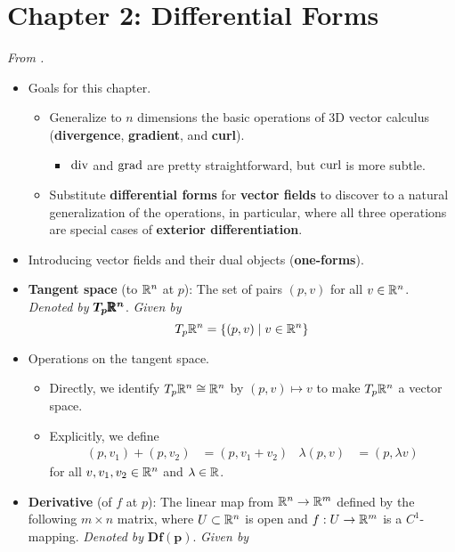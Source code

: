 \documentclass[../notes.tex]{subfiles}
\begin{document}
\section{Chapter 2: Differential Forms}
\emph{From \textcite{bib:DifferentialForms}.}
\begin{itemize}
    \item {}Goals for this chapter.
    \begin{itemize}
        \item Generalize to $n$ dimensions the basic operations of 3D vector calculus (\textbf{divergence}, \textbf{gradient}, and \textbf{curl}).
        \begin{itemize}
            \item $\operatorname{div}$ and $\operatorname{grad}$ are pretty straightforward, but $\operatorname{curl}$ is more subtle.
        \end{itemize}
        \item Substitute \textbf{differential forms} for \textbf{vector fields} to discover to a natural generalization of the operations, in particular, where all three operations are special cases of \textbf{exterior differentiation}.
    \end{itemize}
    \item Introducing vector fields and their dual objects (\textbf{one-forms}).
    \item \textbf{Tangent space} (to $\mathbb{R}^n$ at $p$): The set of pairs $(p,v)$ for all $v\in\mathbb{R}^n$. \emph{Denoted by} $\bm{T_p\pmb{\mathbb{R}}^n}$. \emph{Given by}
    \begin{equation*}
        T_p\mathbb{R}^n = \{(p,v)\mid v\in\mathbb{R}^n\}
    \end{equation*}
    \item Operations on the tangent space.
    \begin{itemize}
        \item Directly, we identify $T_p\mathbb{R}^n\cong\mathbb{R}^n$ by $(p,v)\mapsto v$ to make $T_p\mathbb{R}^n$ a vector space.
        \item Explicitly, we define
        \begin{align*}
            (p,v_1)+(p,v_2) &= (p,v_1+v_2)&
            \lambda(p,v) &= (p,\lambda v)
        \end{align*}
        for all $v,v_1,v_2\in\mathbb{R}^n$ and $\lambda\in\mathbb{R}$.
    \end{itemize}
    \item \textbf{Derivative} (of $f$ at $p$): The linear map from $\mathbb{R}^n\to\mathbb{R}^m$ defined by the following $m\times n$ matrix, where $U\subset\mathbb{R}^n$ is open and $f:U\to\mathbb{R}^m$ is a $C^1$-mapping. \emph{Denoted by} $\bm{Df(p)}$. \emph{Given by}

\end{itemize}
\end{document}

